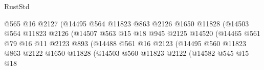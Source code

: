 \begin{lexlean}{RustStd}
\begin{coremodule}
                                          @565
                                          @16
                                          @2127
                                          (@14495
                                            @564
                                            @11823
                                            @863
                                            @2126
                                            @1650
                                            @11828
                                            (@14503
                                              @564
                                              @11823
                                              @2126
                                              (@14507
                                                @563
                                                @15
                                                @18
                                                @945
                                                @2125
                                                @14520
                                                (@14465
                                                  @561
                                                  @79
                                                  @16
                                                  @11
                                                  @2123
                                                  @893
                                                  (@14488
                                                    @561
                                                    @16
                                                    @2123
                                                    (@14495
                                                      @560
                                                      @11823
                                                      @863
                                                      @2122
                                                      @1650
                                                      @11828
                                                      (@14503
                                                        @560
                                                        @11823
                                                        @2122
                                                        (@14582
                                                          @545
                                                          @15
                                                          @18

\end{coremodule}
\end{lexlean}

